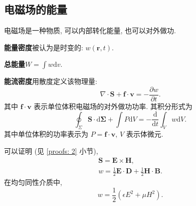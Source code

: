 \subsection{电磁场的能量}
电磁场是一种物质, 可以内部转化能量, 也可以对外做功.

\textbf{能量密度}\quad 被认为是时变的: $w(\bm{r},t)$.

\textbf{总能量}\quad $W=\displaystyle\int w\mathrm{d}v$.

\textbf{能流密度}\quad 用散度定义该物理量:
\begin{equation} \label{eq:2.8 S}
    \nabla\cdot\bm{S}+\bm{f}\cdot\bm{v}=-\frac{\partial w}{\partial t}.
\end{equation}
其中 $\bm{f}\cdot\bm{v}$ 表示单位体积电磁场的对外做功功率. 其积分形式为
\begin{equation}
    \oint_\Sigma\bm{S}\cdot\mathrm{d}\bm{\Sigma}+\int P\mathrm{d}V=-\frac{\mathrm{d}}{\mathrm{d}t}\int_Vw\mathrm{d}V.
\end{equation}
其中单位体积的功率表示为 $P=\bm{f}\cdot\bm{v}$, $V$ 表示体微元.

可以证明 (见 \ref{proofs: 2} 小节),
\begin{gather}
    \bm{S}=\bm{E}\times\bm{H}, \\
    w=\frac{1}{2}\bm{E}\cdot\bm{D}+\frac{1}{2}\bm{H}\cdot\bm{B}.
\end{gather}
在均匀同性介质中,
\begin{equation}
    w=\frac{1}{2}(\epsilon E^2+\mu H^2).
\end{equation}
